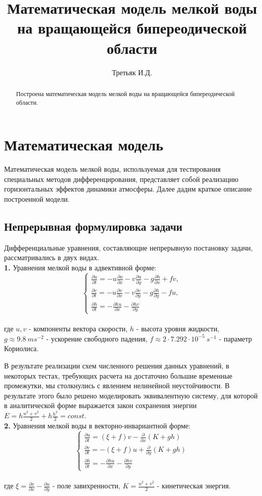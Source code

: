 \documentclass[12pt,a4paper]{article} %
\author{Третьяк И.Д.}
\title{Математическая модель мелкой воды на вращающейся бипереодической области}
\newcommand{\pd}[0]{\partial} %
\begin{document}
\maketitle

\begin{abstract}
Построена математическая модель мелкой воды на вращающейся бипереодической области.
\end{abstract}

\section{Математическая модель}

	Математическая модель мелкой воды, используемая для тестирования специальных методов дифференцирования, представляет собой реализацию горизонтальных эффектов динамики атмосферы. Далее дадим краткое описание построенной модели.

\subsection{Непрерывная формулировка задачи}
	
	Дифференциальные уравнения, составляющие непрерывную постановку задачи, рассматривались в двух видах.\\[1mm]
	\textbf{1.} Уравнения мелкой воды в адвективной форме:
	$$\begin{cases}
	\frac{\pd u}{\pd t} = -u\frac{\pd u}{\pd x} - v\frac{\pd u}{\pd y} - g\frac{\pd h}{\pd x} + fv, \\[1mm]
	\frac{\pd v}{\pd t} = -u\frac{\pd v}{\pd x} - v\frac{\pd v}{\pd y} - g\frac{\pd h}{\pd y} - fu, \\[1mm]
	\frac{\pd h}{\pd t} = -\frac{\pd hu}{\pd x} - \frac{\pd hv}{\pd y}
	\end{cases}$$\\[1mm]
	где $u,v$ - компоненты вектора скорости, $h$ - высота уровня жидкости, $g \approx 9.8 \ ms^{-2}$ - ускорение свободного падения, $f \approx 2 \cdot 7.292 \cdot 10^{-5} \ s^{-1}$ - параметр Кориолиса.
	
	В результате реализации схем численного решения данных уравнений, в некоторых тестах, требующих расчета на достаточно большие временные промежутки, мы столкнулись с явлением нелинейной неустойчивости. В результате этого было решено моделировать эквивалентную систему, для которой в аналитической форме выражается закон сохранения энергии $E=h\frac{u^2 + v^2}{2} + h\frac{h^2}{2} = const$.\\[1mm]
	\textbf{2.} Уравнения мелкой воды в векторно-инвариантной форме:
	$$\begin{cases}
	\frac{\pd u}{\pd t} = (\xi + f)v - \frac{\pd}{\pd x}(K+ gh)\\[1mm]
	\frac{\pd v}{\pd t} = -(\xi + f)u + \frac{\pd}{\pd y}(K+ gh)\\[1mm]
	\frac{\pd h}{\pd t} = -\frac{\pd hu}{\pd x} - \frac{\pd hv}{\pd y}
	\end{cases}$$\\[1mm]
	где $\xi = \frac{\pd v}{\pd x} - \frac{\pd u}{\pd y}$ - поле завихренности, $K=\frac{u^2 + v^2}{2}$ - кинетическая энергия.
	
\end{document}
